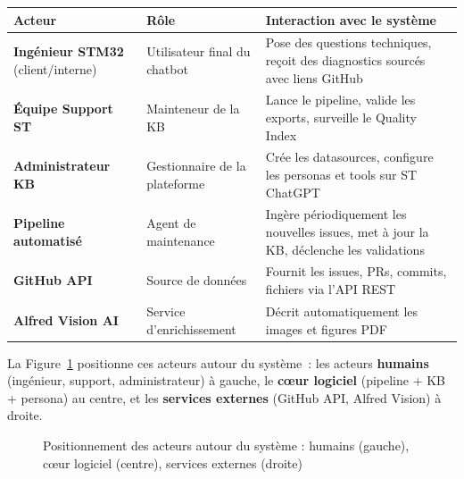 \documentclass[12pt,a4paper]{report}
\begin{document}
\begin{longtable}{p{3.5cm}p{4cm}p{5.5cm}}
\toprule
\textbf{Acteur} & \textbf{Rôle} & \textbf{Interaction avec le système} \\
\midrule
\textbf{Ingénieur STM32} (client/interne) & Utilisateur final du chatbot & Pose des questions techniques, reçoit des diagnostics sourcés avec liens GitHub \\
\textbf{Équipe Support ST} & Mainteneur de la KB & Lance le pipeline, valide les exports, surveille le Quality Index \\
\textbf{Administrateur KB} & Gestionnaire de la plateforme & Crée les datasources, configure les personas et tools sur ST ChatGPT \\
\textbf{Pipeline automatisé} & Agent de maintenance & Ingère périodiquement les nouvelles issues, met à jour la KB, déclenche les validations \\
\textbf{GitHub API} & Source de données & Fournit les issues, PRs, commits, fichiers via l'API REST \\
\textbf{Alfred Vision AI} & Service d'enrichissement & Décrit automatiquement les images et figures PDF \\
\bottomrule
\end{longtable}

La Figure~\ref{fig:actors} positionne ces acteurs autour du système~: les acteurs \textbf{humains} (ingénieur, support, administrateur) à gauche, le \textbf{cœur logiciel} (pipeline + KB + persona) au centre, et les \textbf{services externes} (GitHub API, Alfred Vision) à droite.

\begin{figure}[H]
\centering
{}
\caption{Positionnement des acteurs autour du système : humains (gauche), cœur logiciel (centre), services externes (droite)}
\label{fig:actors}
\end{figure}
\end{document}
